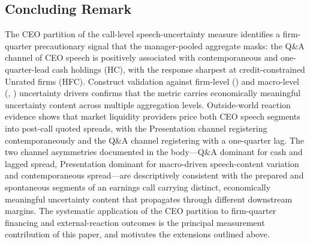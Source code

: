 \subsection{Concluding Remark}

The CEO partition of the call-level speech-uncertainty measure identifies a firm-quarter precautionary signal that the manager-pooled aggregate masks: the Q\&A channel of CEO speech is positively associated with contemporaneous and one-quarter-lead cash holdings (HC), with the response sharpest at credit-constrained Unrated firms (HFC). Construct validation against firm-level () and macro-level (, ) uncertainty drivers confirms that the metric carries economically meaningful uncertainty content across multiple aggregation levels. Outside-world reaction evidence shows that market liquidity providers price both CEO speech segments into post-call quoted spreads, with the Presentation channel registering contemporaneously and the Q\&A channel registering with a one-quarter lag. The two channel asymmetries documented in the body---Q\&A dominant for cash and lagged spread, Presentation dominant for macro-driven speech-content variation and contemporaneous spread---are descriptively consistent with the prepared and spontaneous segments of an earnings call carrying distinct, economically meaningful uncertainty content that propagates through different downstream margins. The systematic application of the CEO partition to firm-quarter financing and external-reaction outcomes is the principal measurement contribution of this paper, and motivates the extensions outlined above.
